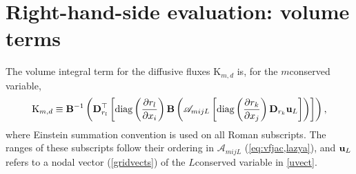 \chapter{Right-hand-side evaluation: volume terms}


%
The volume integral term for the diffusive fluxes $\mbox{K}_{m,d}$ is, for the $m$\nth conserved variable,
\begin{equation}
\mbox{K}_{m,d}\equiv \mathbf{B}^{-1}\left(\mathbf{D}_{r_l}^{\top}
\left[\mbox{diag}\left(\frac{\partial r_l}{\partial x_i}\right)\mathbf{B}\left(\mathscr{A}_{mijL}
\left[\mbox{diag}\left(\frac{\partial r_k}{\partial x_j}\right)\mathbf{D}_{r_k} \mathbf{u}_L\right]\right)\right]\right),
\label{iku}
\end{equation}
where Einstein summation convention is used on all Roman subscripts. The ranges of these subscripts follow
their ordering in $\mathscr{A}_{mijL}$ (\ref{eq:vfjac,lazya}),  %
and ${\bf u}_L$ refers to a nodal vector (\ref{gridvects}) of the $L$\nth conserved variable in
\ref{uvect}.
